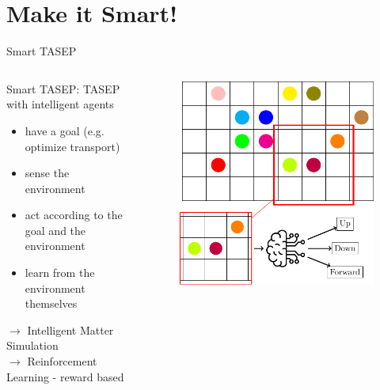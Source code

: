 \documentclass[10pt,xcolor=table, aspectratio=1610]{beamer}
\begin{document}
\section{Make it Smart!}
\begin{frame}{Smart TASEP}
    \begin{columns}
      \begin{block}{Smart TASEP: TASEP with intelligent agents}
      \begin{itemize}
        \item have a goal (e.g. optimize transport)
        \item sense the environment
        \item act according to the goal and the environment
        \item learn from the environment themselves
      \end{itemize}
      $\rightarrow$ Intelligent Matter Simulation \\
      $\rightarrow$ Reinforcement Learning - reward based
      \end{block}
      \begin{figure}
        \includegraphics[width=\textwidth]{img/out/agents.pdf}
      \end{figure}
    \end{columns}
\end{frame}
\end{document}
